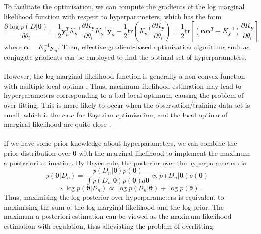 \documentclass[a4paper,11pt]{report}
\begin{document}
\noindent 
To facilitate the optimisation, we can compute the gradients of the log marginal likelihood function with respect to hyperparameters, which has the form
	\begin{equation}
	\dfrac{\partial \log p( D \vert \boldsymbol{\theta}) }{\partial \theta_i} = \dfrac{1}{2} \mathbf{y}_n^T K_{\mathbf{y}}^{-1} \dfrac{\partial K_{\mathbf{y}}}{\partial \theta_i} K_{\mathbf{y}}^{-1}\mathbf{y}_n-\dfrac{1}{2} \mathrm{tr} \left (K_{\mathbf{y}}^{-1} \dfrac{\partial K_{\mathbf{y}}}{\partial \theta_i} \right ) = \dfrac{1}{2}\mathrm{tr} \left[ (\boldsymbol{\alpha} \boldsymbol{\alpha}^T- K_{\mathbf{y}}^{-1}) \dfrac{\partial K_{\mathbf{y}}}{\partial \theta_i} \right] 
	\end{equation} 
where $\boldsymbol\alpha=K_{\mathbf{y}}^{-1} \mathbf{y}_n$. Then, effective gradient-based optimisation algorithms such as conjugate gradients \cite{bishop2006pattern} can be employed to find the optimal set of hyperparameters. 
\\\\
However, the log marginal likelihood function is generally a non-convex function with multiple local optima \cite{bishop2006pattern}. Thus, maximum likelihood estimation may lead to hyperparameters corresponding to a bad local optimum, causing the problem of over-fitting. This is more likely to occur when the observation/training data set is small, which is the case for Bayesian optimisation, and the local optima of marginal likelihood are quite close \cite{rasmussen2006gaussian}.
\\\\ \noindent
If we have some prior knowledge about hyperparameters, we can combine the prior distribution over $\boldsymbol{\theta}$ with the marginal likelihood to implement the maximum a posteriori estimation. By Bayes rule, the posterior over the hyperparameters is 
\begin{equation} \label{hypposterior}
		p(\boldsymbol{\theta} \vert D_n ) = \frac{ p( D_n \vert \boldsymbol{\theta}) p( \boldsymbol{\theta} ) } {\int p( D_n \vert \boldsymbol{\theta}) p( \boldsymbol{\theta} ) d\boldsymbol{\theta} }
		\propto  p( D_n \vert \boldsymbol{\theta}) p( \boldsymbol{\theta} )
\end{equation} 
\begin{equation} \label{hypposterior}
		\Rightarrow \log p(\boldsymbol{\theta} \vert D_n) \propto  \log p( D_n \vert \boldsymbol{\theta}) + \log p( \boldsymbol{\theta} ).
\end{equation} 
Thus, maximising the log posterior over hyperparameters is equivalent to maximising the sum of the log marginal likelihood and the log prior. The maximum a posteriori estimation can be viewed as the maximum likelihood estimation with regulation, thus alleviating the problem of overfitting. 
\end{document}
